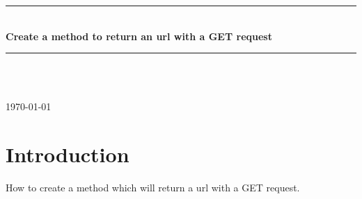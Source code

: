 \documentclass[12pt]{article} %
\begin{document}

\begin{titlepage}

\newcommand{\HRule}{\rule{\linewidth}{0.5mm}} %

\center %

\HRule \\[0.4cm]
{ \huge \bfseries Create a method to return an url with a GET request}\\[0.4cm] %
\HRule \\[1.5cm]

\begin{minipage}{0.4\textwidth}
\end{minipage}\\[4cm]

{\large \today}\\[3cm] %


\vfill %

\end{titlepage}


\tableofcontents %

\newpage %


\section{Introduction} %

How to create a method which will return a url with a GET request.
\end{document}
